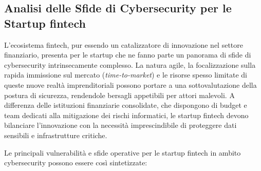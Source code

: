 \subsection{Analisi delle Sfide di Cybersecurity per le Startup fintech}

L'ecosistema fintech, pur essendo un catalizzatore di innovazione nel settore finanziario, presenta per le startup che ne fanno parte un panorama di sfide di cybersecurity intrinsecamente complesso. La natura agile, la focalizzazione sulla rapida immissione sul mercato (\textit{time-to-market}) e le risorse spesso limitate di queste nuove realtà imprenditoriali possono portare a una sottovalutazione della postura di sicurezza, rendendole bersagli appetibili per attori malevoli. A differenza delle istituzioni finanziarie consolidate, che dispongono di budget e team dedicati alla mitigazione dei rischi informatici, le startup fintech devono bilanciare l'innovazione con la necessità imprescindibile di proteggere dati sensibili e infrastrutture critiche.

Le principali vulnerabilità e sfide operative per le startup fintech in ambito cybersecurity possono essere così sintetizzate:

